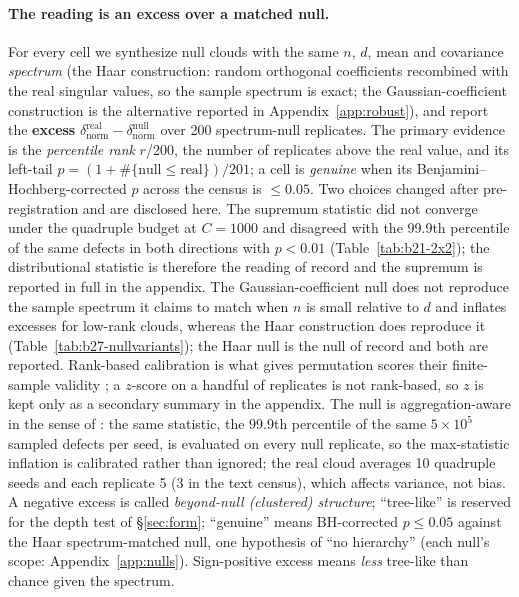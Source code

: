 \documentclass{article}
\begin{document}
\paragraph{The reading is an excess over a matched null.} For every cell we synthesize null clouds with the same $n$, $d$, mean and covariance \emph{spectrum} (the Haar construction: random orthogonal coefficients recombined with the real singular values, so the sample spectrum is exact; the Gaussian-coefficient construction is the alternative reported in Appendix~\ref{app:robust}), and report the \textbf{excess} $\delta_{\text{norm}}^{\text{real}}-\delta_{\text{norm}}^{\text{null}}$ over 200 spectrum-null replicates. The primary evidence is the \emph{percentile rank} $r$/200, the number of replicates above the real value, and its left-tail $p=(1+\#\{\text{null}\le\text{real}\})/201$; a cell is \emph{genuine} when its Benjamini--Hochberg-corrected $p$ across the census is $\le0.05$. Two choices changed after pre-registration and are disclosed here. The supremum statistic did not converge under the quadruple budget at $C{=}1000$ and disagreed with the 99.9th percentile of the same defects in both directions with $p<0.01$ (Table~\ref{tab:b21-2x2}); the distributional statistic is therefore the reading of record and the supremum is reported in full in the appendix. The Gaussian-coefficient null does not reproduce the sample spectrum it claims to match when $n$ is small relative to $d$ and inflates excesses for low-rank clouds, whereas the Haar construction does reproduce it (Table~\ref{tab:b27-nullvariants}); the Haar null is the null of record and both are reported. Rank-based calibration is what gives permutation scores their finite-sample validity \citep[\S5.1]{groger2026aristotelian}; a $z$-score on a handful of replicates is not rank-based, so $z$ is kept only as a secondary summary in the appendix. The null is aggregation-aware in the sense of \citet[\S5.2]{groger2026aristotelian}: the same statistic, the 99.9th percentile of the same $5{\times}10^5$ sampled defects per seed, is evaluated on every null replicate, so the max-statistic inflation is calibrated rather than ignored; the real cloud averages 10 quadruple seeds and each replicate 5 (3 in the text census), which affects variance, not bias. A negative excess is called \emph{beyond-null (clustered) structure}; ``tree-like'' is reserved for the depth test of \S\ref{sec:form}; ``genuine'' means BH-corrected $p\le0.05$ against the Haar spectrum-matched null, one hypothesis of ``no hierarchy'' (each null's scope: Appendix~\ref{app:nulls}). Sign-positive excess means \emph{less} tree-like than chance given the spectrum.
\end{document}
